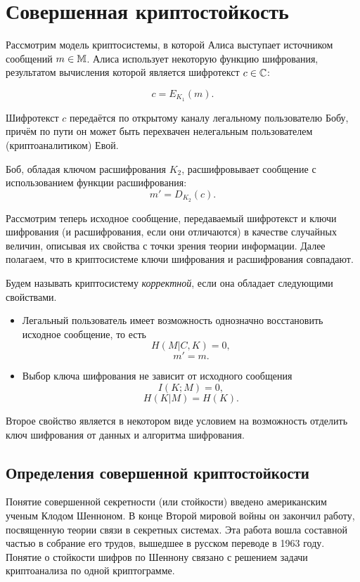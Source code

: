 \chapter{Совершенная криптостойкость}

Рассмотрим модель криптосистемы, в которой Алиса выступает источником сообщений $m \in \mathbb{M}$. Алиса использует некоторую функцию шифрования, результатом вычисления которой является шифротекст $c \in \mathbb{C}$:

	\[c = E_{K_1}\left(m\right).\]

Шифротекст $c$ передаётся по открытому каналу легальному пользователю Бобу, причём по пути он может быть перехвачен нелегальным пользователем (криптоаналитиком) Евой.

Боб, обладая ключом расшифрования $K_2$, расшифровывает сообщение с использованием функции расшифрования:
	\[m' = D_{K_2}\left(c \right).\]

Рассмотрим теперь исходное сообщение, передаваемый шифротекст и ключи шифрования (и расшифрования, если они отличаются) в качестве случайных величин, описывая их свойства с точки зрения теории информации. Далее полагаем, что в криптосистеме ключи шифрования и расшифрования совпадают.

Будем называть криптосистему \emph{корректной}, если она обладает следующими свойствами.
\begin{itemize}
	\item Легальный пользователь имеет возможность однозначно восстановить исходное сообщение, то есть
					\[H \left( M | C, K \right) = 0, \]
					\[m' = m.\]
	\item Выбор ключа шифрования не зависит от исходного сообщения
					\[ I \left( K ; M \right) = 0, \]
					\[ H \left( K | M \right) = H \left( K \right). \]
\end{itemize}

Второе свойство является в некотором виде условием на возможность отделить ключ шифрования от данных и алгоритма шифрования.

\section[Определения]{Определения совершенной криптостойкости}

Понятие совершенной секретности (или стойкости) введено американским ученым Клодом Шенноном. В конце Второй мировой войны он закончил работу, посвященную теории связи в секретных системах\cite{Shannon:1949:CTS}. Эта работа вошла составной частью в собрание его трудов, вышедшее в русском переводе в 1963 году.~\cite{Shannon:1963} Понятие о стойкости шифров по Шеннону связано с решением задачи криптоанализа по одной криптограмме.

